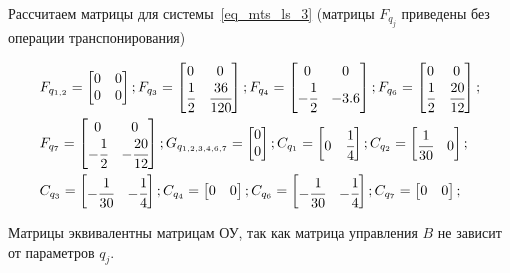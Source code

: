 Рассчитаем матрицы для системы~\ref{eq_mts_ls_3} (матрицы $F_{q_j}$ приведены без операции транспонирования)

\begin{align}\label{mxs_sense}
&F_{q_{1,2}} = 
\begin{bmatrix}
0 & 0\\
0 & 0
\end{bmatrix};
F_{q_3} = 
\begin{bmatrix}
0 & 0\\
\cfrac{1}{2} & \cfrac{36}{120}
\end{bmatrix};
F_{q_4} = 
\begin{bmatrix}
0 & 0\\
- \cfrac{1}{2} & - 3.6
\end{bmatrix};
F_{q_6} = 
\begin{bmatrix}
0 & 0\\
\cfrac{1}{2} & \cfrac{20}{12}
\end{bmatrix};\\
&F_{q_7} = 
\begin{bmatrix}
0 & 0\\
- \cfrac{1}{2} & - \cfrac{20}{12}
\end{bmatrix};
G_{q_{1,2,3,4,6,7}} = 
\begin{bmatrix}
0\\
0
\end{bmatrix};
C_{q_1} = 
\begin{bmatrix}
0 & \cfrac{1}{4}
\end{bmatrix};
C_{q_2} = 
\begin{bmatrix}
\cfrac{1}{30} & 0
\end{bmatrix};\\
&C_{q_3} = 
\begin{bmatrix}
- \cfrac{1}{30} & - \cfrac{1}{4}
\end{bmatrix};
C_{q_4} = 
\begin{bmatrix}
0 & 0
\end{bmatrix};
C_{q_6} = 
\begin{bmatrix}
- \cfrac{1}{30} & - \cfrac{1}{4}
\end{bmatrix};
C_{q_7} = 
\begin{bmatrix}
0 & 0
\end{bmatrix};
\end{align}

Матрицы эквивалентны матрицам ОУ, так как матрица управления $B$ не зависит от параметров $q_j$.

